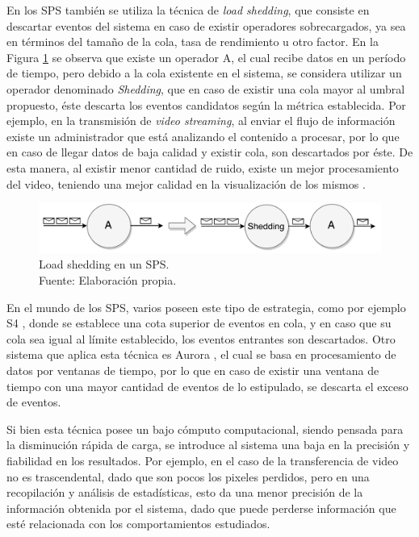 En los SPS también se utiliza la técnica de \textit{load shedding}, que consiste en descartar eventos del sistema en caso de existir operadores sobrecargados, ya sea \normalsize{en términos del} tamaño de la cola, tasa de rendimiento u otro factor. En la Figura \ref{fig:loadShedding} se observa que existe un operador A, el cual recibe datos en un período de tiempo, pero debido a la cola existente en el sistema, se considera utilizar un operador denominado \textit{Shedding}, que en caso de existir una cola mayor al umbral propuesto, éste descarta los eventos candidatos según la métrica establecida. Por ejemplo, en la transmisión de \textit{video streaming}, al enviar el flujo de información existe un administrador que está analizando el contenido a procesar, por lo que en caso de llegar datos de baja calidad y existir cola, son descartados por éste. De esta manera, al existir menor cantidad de ruido, existe un mejor procesamiento del video, teniendo una mejor calidad en la visualización de los mismos \citep{SheuC09}. 

\begin{figure}[!ht]
	\centering
	\includegraphics[scale=0.6]{images/LoadShedding.pdf}
	\caption[Load shedding en un SPS.]{Load shedding en un SPS.\\Fuente: Elaboración propia.}
	\label{fig:loadShedding}
\end{figure}

En el mundo de los SPS, varios poseen este tipo de estrategia, como por ejemplo S4 \citep{s4}, donde se establece una cota superior de eventos en cola, y en caso que su cola sea igual al límite establecido, los eventos entrantes son descartados. Otro sistema que aplica esta técnica es Aurora \citep{aurora}, el cual se basa en procesamiento de datos por ventanas de tiempo, por lo que en caso de existir una ventana de tiempo con una mayor cantidad de eventos de lo estipulado, se descarta el exceso de eventos.

Si bien esta técnica \normalsize{posee un bajo cómputo computacional}, siendo pensada para la disminución rápida de carga, se introduce al sistema una baja en la precisión y fiabilidad en los resultados. Por ejemplo, en el caso de la transferencia de video no es trascendental, dado que son pocos los pixeles perdidos, pero en una recopilación y análisis de estadísticas, esto da una menor precisión de la información obtenida por el sistema, dado que puede perderse información que esté relacionada con los comportamientos estudiados.

